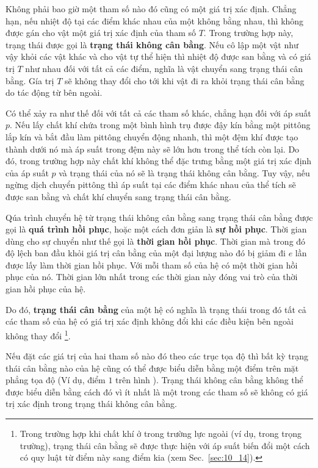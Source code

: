 Không phải bao giờ một tham số nào đó cũng có một giá trị xác định. Chẳng hạn, nếu nhiệt độ tại các điểm khác nhau của một không bằng nhau, thì không được gán cho vật một giá trị xác định của tham số $T$. Trong trường hợp này, trạng thái được gọi là \textbf{trạng thái không cân bằng}. Nếu cô lập một vật như vậy khỏi các vật khác và cho vật tự thể hiện thì nhiệt độ được san bằng và có giá trị $T$ như nhau đối với tất cả các điểm, nghĩa là vật chuyển sang trạng thái cân bằng. Gía trị $T$ sẽ không thay đổi cho tới khi vật đi ra khỏi trạng thái cân bằng do tác động từ bên ngoài.

Có thể xảy ra như thế đối với tất cả các tham số khác, chẳng hạn đối với áp suất $p$. Nếu lấy chất khí chứa trong một bình hình trụ được đậy kín bằng một pittông lắp kín và bắt đầu làm pittông chuyển động nhanh, thì một đệm khí được tạo thành dưới nó mà áp suất trong đệm này sẽ lớn hơn trong thể tích còn lại. Do đó, trong trường hợp này chất khí không thể đặc trưng bằng một giá trị xác định của áp suất  $p$ và trạng thái của nó sẽ là trạng thái không cân bằng. Tuy vậy, nếu ngừng dịch chuyển pittông thì áp suất tại các điểm khác nhau của thể tích sẽ được san bằng và chất khí chuyển sang trạng thái cân bằng.

Qúa trình chuyển hệ từ trạng thái không cân bằng sang trạng thái cân bằng được gọi là \textbf{quá trình hồi phục}, hoặc một cách đơn giản là \textbf{sự hồi phục}. Thời gian dùng cho sự chuyển như thế gọi là \textbf{thời gian hồi phục}. Thời gian mà trong đó độ lệch ban đầu khỏi giá trị cân bằng của một đại lượng nào đó bị giảm đi $e$ lần được lấy làm thời gian hồi phục. Với mỗi tham số của hệ có một thời gian hồi phục của nó. Thời gian lớn nhất trong các thời gian này đóng vai trò của thời gian hồi phục của hệ.

Do đó, \textbf{trạng thái cân bằng} của một hệ có nghĩa là trạng thái trong đó tất cả các tham số của hệ có giá trị xác định không đổi khi các điều kiện bên ngoài không thay đổi \footnote{Trong trường hợp khi chất khí ở trong trường lực ngoài (ví dụ, trong trọng trường), trạng thái cân bằng sẽ được thực hiện với áp suất biến đổi một cách có quy luật từ điểm này sang điểm kia  (xem Sec.~\ref{sec:10_14}).}.

Nếu đặt các giá trị của hai tham số nào đó theo các trục tọa độ thì bất kỳ trạng thái cân bằng nào của hệ cũng có thể được biểu diễn bằng một điểm trên mặt phẳng tọa độ (Ví dụ, điểm $1$ trên hình ). Trạng thái không cân bằng không thể được biểu diễn bằng cách đó vì ít nhất là một trong các tham số sẽ không có giá trị xác định trong trạng thái không cân bằng.


